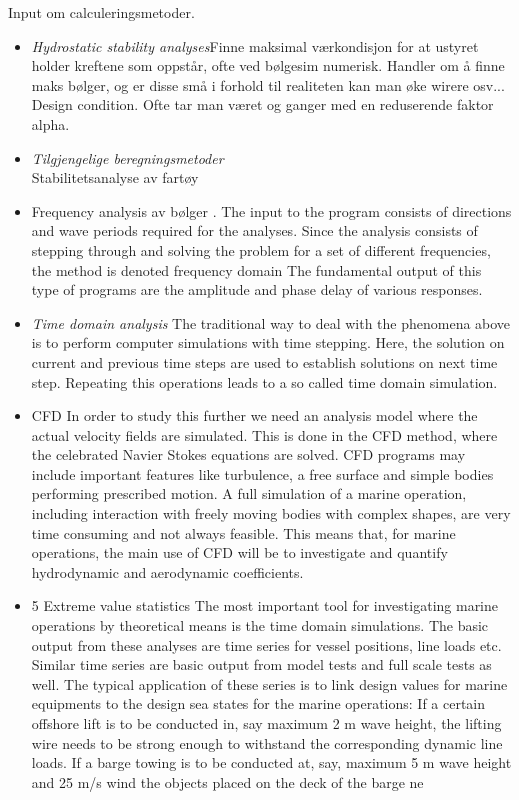 \documentclass[a4paper,norsk]{article}
\begin{document}
Input om calculeringsmetoder.
\begin{itemize}

\item \textit{Hydrostatic stability analyses}Finne maksimal værkondisjon for at ustyret holder kreftene som oppstår, ofte ved bølgesim numerisk. Handler 
om å finne maks bølger, og er disse små i forhold til realiteten kan man øke wirere osv... Design condition. Ofte tar man været og ganger med en reduserende faktor alpha. 
\item \textit{Tilgjengelige beregningsmetoder} \\
Stabilitetsanalyse av fartøy
\item Frequency analysis av bølger . The input to the program consists of
directions and wave periods required for the analyses. Since the analysis consists of stepping
through and solving the problem for a set of different frequencies, the method is denoted
frequency domain The fundamental output of this type of programs are the amplitude and phase
delay of various responses.

\item \textit{Time domain analysis} The traditional way to deal with the phenomena above is to perform computer simulations
with time stepping. Here, the solution on current and previous time steps are used to
establish solutions on next time step. Repeating this operations leads to a so called time
domain simulation.

\item{CFD} In order to study this further we need an analysis model where the actual velocity fields
are simulated. This is done in the CFD method, where the celebrated Navier Stokes equations
are solved. CFD programs may include important features like turbulence, a free surface and
simple bodies performing prescribed motion. A full simulation of a marine operation, including
interaction with freely moving bodies with complex shapes, are very time consuming and not
always feasible. This means that, for marine operations, the main use of CFD will be to
investigate and quantify hydrodynamic and aerodynamic coefficients.

\item 5 Extreme value statistics
The most important tool for investigating marine operations by theoretical means is the time
domain simulations. The basic output from these analyses are time series for vessel positions,
line loads etc. Similar time series are basic output from model tests and full scale tests as well.
The typical application of these series is to link design values for marine equipments to the
design sea states for the marine operations: If a certain offshore lift is to be conducted in, say
maximum 2 m wave height, the lifting wire needs to be strong enough to withstand the
corresponding dynamic line loads. If a barge towing is to be conducted at, say, maximum 5 m
wave height and 25 m/s wind the objects placed on the deck of the barge ne
\end{itemize}
 
\end{document}
